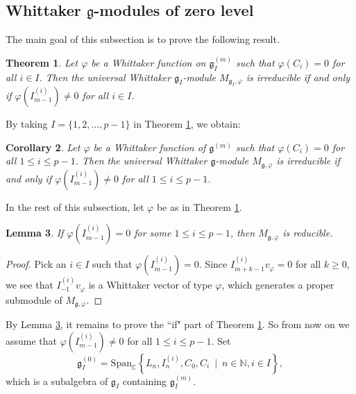 \documentclass[12pt, reqno]{amsart}
\numberwithin{equation}{section}
\newtheorem{theorem}{Theorem}[section]
\newtheorem{lemma}[theorem]{Lemma}%
\newtheorem{corollary}[theorem]{Corollary}%
\numberwithin{equation}{section}
\def\g{\mathfrak{g}}
\def\vf{\varphi}
\def\vvf{v_{\vf}}
\def\gi{\g_I}
\def\gizero{\gi^{(0)}}
\def\gim{\gi^{(m)}}
\newcommand{\C}{\mathbb C}
\newcommand{\N}{\mathbb{N}}
\newcommand{\spanc}[1]{\mathrm{Span}_{\C}\left\{#1\right\}}
\newcommand{\elei}[2]{I_{#1}^{(#2)}}
\newcommand{\vfi}[2]{\vf\left(I_{#1}^{(#2)}\right)}
\begin{document}
\subsection{Whittaker $\g$-modules of zero level}
The main goal of this subsection is to prove the following result.
\begin{theorem}\label{thm:zerolevel}
 Let $\varphi$ be a Whittaker function on $\g_I^{(m)}$ such that $\varphi(C_i)=0$ for all $i\in I$. Then the universal Whittaker $\g_I$-module $M_{\g_I,\varphi}$ is irreducible if and only if
 $\vfi{m-1}i\neq 0$ for all $i\in I$.
\end{theorem}

By taking $I=\{1,2,\dots,p-1\}$ in Theorem \ref{thm:zerolevel}, we obtain:


\begin{corollary}\label{corzerolevelgmod}
 Let $\varphi$ be a Whittaker function of $\g^{(m)}$ such that $\varphi(C_i)=0$ for all $1\le i\le p-1$. Then the universal Whittaker $\g$-module $M_{\g,\varphi}$ is irreducible if and only if
 $\vfi{m-1}i\neq 0$ for all $1\leq i\leq p-1$.
\end{corollary}

In the rest of this subsection, let $\varphi$ be as in Theorem \ref{thm:zerolevel}.

\begin{lemma}\label{lem:onlyifpart}
  If   $\vfi{m-1}i= 0$ for some  $1\leq i\leq p-1$, then  $M_{\g,\varphi}$ is reducible.
\end{lemma}
\begin{proof}
 Pick an $i\in I$ such that  $\vfi{m-1}i=0$.
Since $\elei{m+k-1}i\vvf=0$ for all $k\geq 0$,
we see that $\elei{-1}i\vvf$ is a Whittaker vector of type $\varphi$,
which generates a proper submodule of $M_{\g,\varphi}$.
\end{proof}

By Lemma \ref{lem:onlyifpart}, it remains to prove the ``if" part of Theorem \ref{thm:zerolevel}.
So from now on we  assume that  $\vfi{m-1}i\neq 0$ for all  $1\leq i\leq p-1$.
Set
\[\gizero=\spanc{L_{n},\elei ni,C_0,C_i\ \mid\ n\in\N, i\in I},\]  which is a subalgebra of $\g_I$ containing $\gim$.
\end{document}
